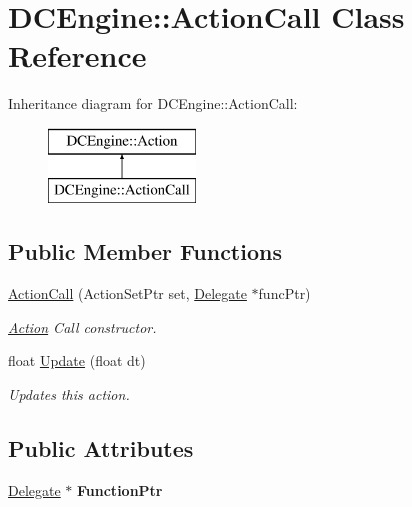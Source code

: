 \hypertarget{classDCEngine_1_1ActionCall}{\section{D\-C\-Engine\-:\-:Action\-Call Class Reference}
\label{classDCEngine_1_1ActionCall}
}
Inheritance diagram for D\-C\-Engine\-:\-:Action\-Call\-:\begin{figure}[H]
\begin{center}
\leavevmode
\includegraphics[height=2.000000cm]{classDCEngine_1_1ActionCall}
\end{center}
\end{figure}
\subsection*{Public Member Functions}
\begin{DoxyCompactItemize}
\item 
\hyperlink{classDCEngine_1_1ActionCall_a2cc7f5a35ff15249efb4eecca1cc17ea}{Action\-Call} (Action\-Set\-Ptr set, \hyperlink{classDCEngine_1_1Delegate}{Delegate} $\ast$func\-Ptr)
\begin{DoxyCompactList}\small\item\em \hyperlink{classDCEngine_1_1Action}{Action} Call constructor. \end{DoxyCompactList}\item 
float \hyperlink{classDCEngine_1_1ActionCall_a235459e7b9ee2094418761a3bb96dd15}{Update} (float dt)
\begin{DoxyCompactList}\small\item\em Updates this action. \end{DoxyCompactList}\end{DoxyCompactItemize}
\subsection*{Public Attributes}
\begin{DoxyCompactItemize}
\item 
\hypertarget{classDCEngine_1_1ActionCall_a47aae48f25634bd713ad99a1ab49a7ff}{\hyperlink{classDCEngine_1_1Delegate}{Delegate} $\ast$ {\bfseries Function\-Ptr}}\label{classDCEngine_1_1ActionCall_a47aae48f25634bd713ad99a1ab49a7ff}

\end{DoxyCompactItemize}
